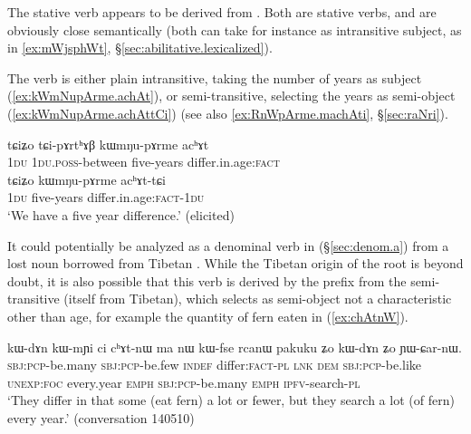 The stative verb  appears to be derived from . Both are stative verbs, and are obviously close semantically (both can take for instance  as intransitive subject, as in \ref{ex:mWjsphWt}, §\ref{sec:abilitative.lexicalized}). 

The verb  is either plain intransitive, taking the number of years as subject (\ref{ex:kWmNupArme.achAt}), or semi-transitive, selecting the years as semi-object (\ref{ex:kWmNupArme.achAttCi})  (see also \ref{ex:RnWpArme.machAti}, §\ref{sec:raNri}).

\begin{exe}
\ex \label{ex:kWmNupArme.achAt}
\begin{xlist}
\ex 
\gll tɕiʑo tɕi-pɤrtʰɤβ kɯmŋu-pɤrme acʰɤt \\
\textsc{1du} \textsc{1du}.\textsc{poss}-between five-years differ.in.age:\textsc{fact} \\
\ex \label{ex:kWmNupArme.achAttCi}
\gll tɕiʑo kɯmŋu-pɤrme acʰɤt-tɕi \\
\textsc{1du} five-years differ.in.age:\textsc{fact}-\textsc{1du} \\
\glt `We have a five year difference.' (elicited)
\end{xlist}
\end{exe}

It could potentially be analyzed as a denominal verb in  (§\ref{sec:denom.a}) from a lost noun  borrowed from Tibetan . While the Tibetan origin of the root is beyond doubt, it is also possible that this verb is derived by the  prefix from the semi-transitive  (itself from Tibetan), which selects as semi-object not a characteristic other than age, for example the quantity of fern eaten in (\ref{ex:chAtnW}).

\begin{exe}
\ex \label{ex:chAtnW} 
\gll kɯ-dɤn kɯ-mɲi ci cʰɤt-nɯ ma nɯ kɯ-fse rcanɯ pakuku ʑo kɯ-dɤn ʑo ɲɯ-ɕar-nɯ.  \\
\textsc{sbj}:\textsc{pcp}-be.many \textsc{sbj}:\textsc{pcp}-be.few \textsc{indef} differ:\textsc{fact}-\textsc{pl} \textsc{lnk} \textsc{dem} \textsc{sbj}:\textsc{pcp}-be.like \textsc{unexp}:\textsc{foc} every.year \textsc{emph} \textsc{sbj}:\textsc{pcp}-be.many \textsc{emph} \textsc{ipfv}-search-\textsc{pl} \\
\glt `They differ in that some (eat fern) a lot or fewer, but they search a lot (of fern) every year.' (conversation 140510)
\end{exe}

